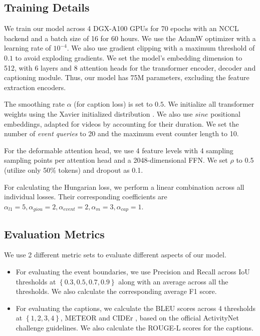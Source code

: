 \subsection {Training Details}
\par We train our model across 4 DGX-A100 GPUs for 70 epochs with an NCCL backend and a batch size of 16 for 60 hours. We use the AdamW optimizer with a learning rate of $10^{-4}$. We also use gradient clipping with a maximum threshold of $0.1$ to avoid exploding gradients. We set the model's embedding dimension to 512, with 6 layers and 8 attention heads for the transformer encoder, decoder and captioning module. Thus, our model has 75M parameters, excluding the feature extraction encoders. 
\par The smoothing rate $\alpha$ (for caption loss) is set to $0.5$. We initialize all transformer weights using the Xavier initialized distribution \cite{xavier}. We also use $sine$ positional embeddings, adapted for videos by accounting for their duration. We set the number of \textit{event queries} to 20 and the maximum event counter length to 10.
\par For the deformable attention head, we use 4 feature levels with 4 sampling sampling points per attention head and a 2048-dimensional FFN. We set $\rho$ to 0.5 (utilize only 50\% tokens) and dropout as 0.1.
\par For calculating the Hungarian loss, we perform a linear combination across all individual losses. Their corresponding coefficients are $\alpha_{l1}=5, \alpha_{giou}=2, \alpha_{event}=2, \alpha_m=3, \alpha_{cap}=1$.

\subsection {Evaluation Metrics}
\par We use 2 different metric sets to evaluate different aspects of our model.
\begin{itemize}
	\item For evaluating the event boundaries, we use Precision and Recall across IoU thresholds at $\left \{0.3, 0.5, 0.7, 0.9 \right\}$ along with an average across all the thresholds. We also calculate the corresponding average F1 score.
	\item For evaluating the captions, we calculate the BLEU \cite{bleu} scores across 4 thresholds at $\left \{1, 2, 3, 4\right\}$, METEOR \cite{meteor} and CIDEr \cite{cider}, based on the official ActivityNet challenge guidelines. We also calculate the ROUGE-L \cite{rouge} scores for the captions.
\end{itemize}

